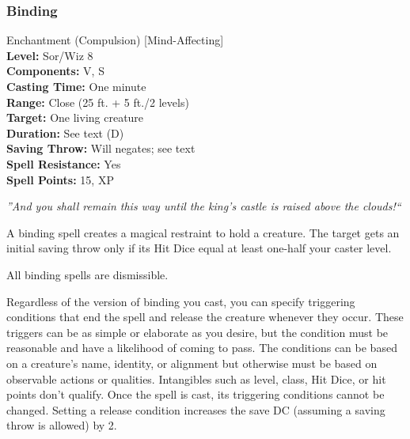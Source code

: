 \subsubsection{Binding}
\label{Spell:Binding}
Enchantment (Compulsion) [Mind-Affecting]
\\ \textbf{Level:} Sor/Wiz 8 
\\ \textbf{Components:} V, S 
\\ \textbf{Casting Time:} One minute 
\\ \textbf{Range:} Close (25 ft. + 5 ft./2 levels)
\\ \textbf{Target:} One living creature 
\\ \textbf{Duration:} See text (D)
\\ \textbf{Saving Throw:} Will negates; see text
\\ \textbf{Spell Resistance:} Yes
\\ \textbf{Spell Points:} 15, XP

\emph{''And you shall remain this way until the king's castle is raised above the clouds!``}

A binding spell creates a magical restraint to hold a creature. 
The target gets an initial saving throw only if its Hit Dice equal at least one-half your caster level.

All binding spells are dismissible.

Regardless of the version of binding you cast, 
you can specify triggering conditions that end the spell and release the creature whenever they occur. 
These triggers can be as simple or elaborate as you desire, but the condition must be reasonable and have a likelihood of coming to pass. 
The conditions can be based on a creature's name, identity, or alignment but otherwise must be based on observable actions or qualities. 
Intangibles such as level, class, Hit Dice, or hit points don't qualify. 
Once the spell is cast, its triggering conditions cannot be changed. 
Setting a release condition increases the save DC (assuming a saving throw is allowed) by 2.

